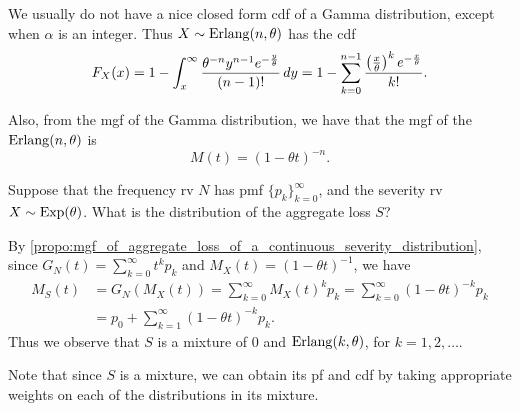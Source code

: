 \documentclass[notoc,notitlepage]{tufte-book}
\begin{document}
\begin{remark}
  We usually do not have a nice closed form cdf of a Gamma distribution, except when $\alpha$ is an integer. Thus $X \sim \operatorname{Erlang}(n, \theta)$ has the cdf
  \begin{equation*}
    F_X(x) = 1 - \int_{x}^{\infty} \frac{\theta^{-n} y^{n - 1} e^{- \frac{y}{\theta}}}{( n - 1 )!} \mathop{}\!d{y} = 1 - \sum_{k=0}^{n - 1} \frac{\left( \frac{x}{\theta} \right)^k e^{-\frac{x}{\theta}}}{k!}.
  \end{equation*}

  Also, from the mgf of the Gamma distribution, we have that the mgf of the $\operatorname{Erlang}(n, \theta)$ is
  \begin{equation*}
    M(t) = ( 1 - \theta t )^{-n}.
  \end{equation*}
\end{remark}

\begin{eg}
  Suppose that the frequency rv $N$ has pmf $\{ p_k \}_{k = 0}^{\infty}$, and the severity rv $X \sim \operatorname{Exp}(\theta)$. What is the distribution of the aggregate loss $S$?
\end{eg}

\begin{solution}
  By \cref{propo:mgf_of_aggregate_loss_of_a_continuous_severity_distribution}, since $G_N(t) = \sum_{k=0}^{\infty} t^k p_k$ and $M_X(t) = ( 1 - \theta t )^{-1}$, we have
  \begin{align*}
    M_S(t) &= G_N(M_X(t)) = \sum_{k=0}^{\infty} M_X(t)^k p_k = \sum_{k=0}^{\infty} (1 - \theta t)^{-k} p_k \\
           &= p_0 + \sum_{k=1}^{\infty} (1 - \theta t)^{-k} p_k.
  \end{align*}
  Thus we observe that $S$ is a mixture of $0$ and $\operatorname{Erlang}(k, \theta)$, for $k = 1, 2, \ldots$.
\end{solution}

\begin{note}
  Note that since $S$ is a mixture, we can obtain its pf and cdf by taking appropriate weights on each of the distributions in its mixture.
\end{note}
\end{document}
